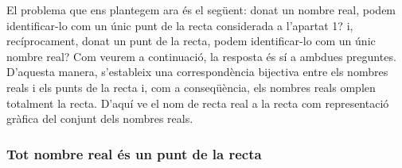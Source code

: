 El problema que ens plantegem ara és el següent: donat un nombre
real, podem identificar-lo com un únic punt de la
recta considerada a l’apartat 1? i, recíprocament, donat un punt de
la recta, podem identificar-lo com un únic nombre real? Com veurem a continuació, la resposta és sí a ambdues
preguntes. D’aquesta manera, s’estableix una correspondència bijectiva entre
els nombres reals i els punts de la recta i, com a conseqüència, els nombres reals omplen totalment la recta. D’aquí ve el nom de
recta real a la recta com representació gràfica del conjunt dels
nombres reals.

\subsubsection{Tot nombre real és un punt de la recta}

